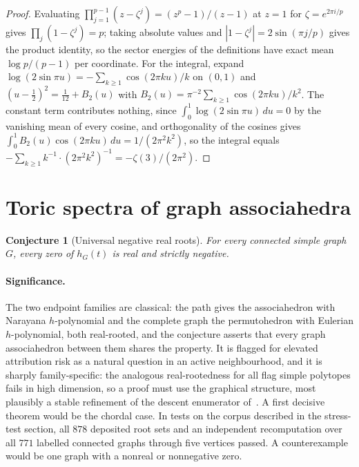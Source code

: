 \documentclass[11pt]{article}
\newtheorem{conjecture}{Conjecture}
\theoremstyle{definition}
\begin{document}
\begin{proof}
Evaluating $\prod_{j=1}^{p-1}(z-\zeta^j)=(z^p-1)/(z-1)$ at $z=1$ for $\zeta=e^{2\pi i/p}$ gives $\prod_j(1-\zeta^j)=p$; taking absolute values and $|1-\zeta^j|=2\sin(\pi j/p)$ gives the product identity, so the sector energies of the definitions have exact mean $\log p/(p-1)$ per coordinate.  For the integral, expand $\log(2\sin\pi u)=-\sum_{k\ge1}\cos(2\pi ku)/k$ on $(0,1)$ and $(u-\tfrac12)^2=\tfrac1{12}+B_2(u)$ with $B_2(u)=\pi^{-2}\sum_{k\ge1}\cos(2\pi ku)/k^2$.  The constant term contributes nothing, since $\int_0^1\log(2\sin\pi u)\,du=0$ by the vanishing mean of every cosine, and orthogonality of the cosines gives $\int_0^1B_2(u)\cos(2\pi ku)\,du=1/(2\pi^2k^2)$, so the integral equals $-\sum_{k\ge1}k^{-1}\cdot(2\pi^2k^2)^{-1}=-\zeta(3)/(2\pi^2)$.
\end{proof}

\section{Toric spectra of graph associahedra}

\begin{conjecture}[Universal negative real roots]\label{z1}
For every connected simple graph $G$, every zero of $h_G(t)$ is real and strictly negative.
\end{conjecture}

\paragraph{Significance.}
The two endpoint families are classical: the path gives the associahedron with Narayana $h$-polynomial and the complete graph the permutohedron with Eulerian $h$-polynomial, both real-rooted, and the conjecture asserts that every graph associahedron between them shares the property.  It is flagged for elevated attribution risk as a natural question in an active neighbourhood, and it is sharply family-specific: the analogous real-rootedness for all flag simple polytopes fails in high dimension, so a proof must use the graphical structure, most plausibly a stable refinement of the descent enumerator of~\cite{PRW08}.  A first decisive theorem would be the chordal case.  In tests on the corpus described in the stress-test section, all $878$ deposited root sets and an independent recomputation over all $771$ labelled connected graphs through five vertices passed.  A counterexample would be one graph with a nonreal or nonnegative zero.
\end{document}
